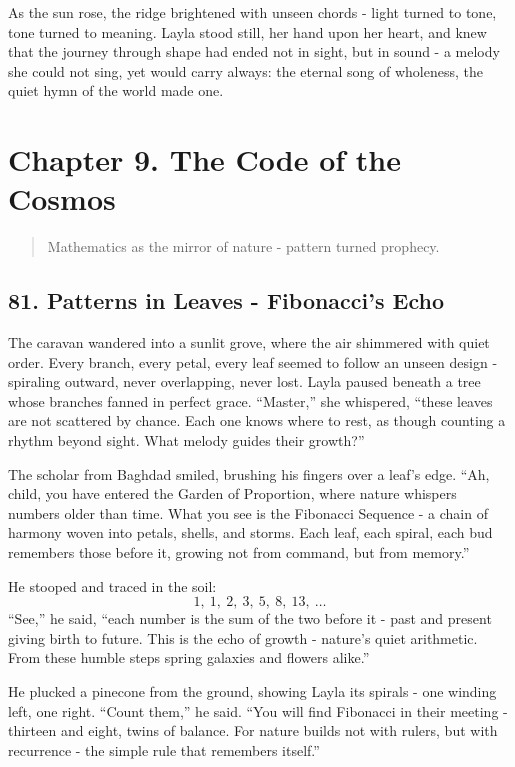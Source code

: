 \documentclass[
  letterpaper,
  DIV=11,
  numbers=noendperiod]{scrreprt}
\begin{document}
As the sun rose, the ridge brightened with unseen chords - light turned
to tone, tone turned to meaning. Layla stood still, her hand upon her
heart, and knew that the journey through shape had ended not in sight,
but in sound - a melody she could not sing, yet would carry always: the
eternal song of wholeness, the quiet hymn of the world made one.

\section{Chapter 9. The Code of the
Cosmos}\label{chapter-9.-the-code-of-the-cosmos}

\begin{quote}
Mathematics as the mirror of nature - pattern turned prophecy.
\end{quote}

\subsection{81. Patterns in Leaves - Fibonacci's
Echo}\label{patterns-in-leaves---fibonaccis-echo}

The caravan wandered into a sunlit grove, where the air shimmered with
quiet order. Every branch, every petal, every leaf seemed to follow an
unseen design - spiraling outward, never overlapping, never lost. Layla
paused beneath a tree whose branches fanned in perfect grace.
``Master,'' she whispered, ``these leaves are not scattered by chance.
Each one knows where to rest, as though counting a rhythm beyond sight.
What melody guides their growth?''

The scholar from Baghdad smiled, brushing his fingers over a leaf's
edge. ``Ah, child, you have entered the Garden of Proportion, where
nature whispers numbers older than time. What you see is the Fibonacci
Sequence - a chain of harmony woven into petals, shells, and storms.
Each leaf, each spiral, each bud remembers those before it, growing not
from command, but from memory.''

He stooped and traced in the soil: \[
1,\ 1,\ 2,\ 3,\ 5,\ 8,\ 13,\ \ldots
\] ``See,'' he said, ``each number is the sum of the two before it -
past and present giving birth to future. This is the echo of growth -
nature's quiet arithmetic. From these humble steps spring galaxies and
flowers alike.''

He plucked a pinecone from the ground, showing Layla its spirals - one
winding left, one right. ``Count them,'' he said. ``You will find
Fibonacci in their meeting - thirteen and eight, twins of balance. For
nature builds not with rulers, but with recurrence - the simple rule
that remembers itself.''
\end{document}
